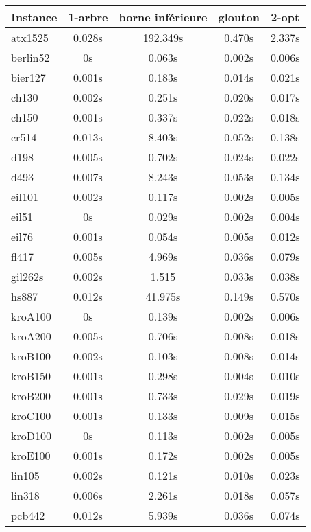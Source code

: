 \begin{longtable}{|l||c|c|c|c|}
  \hline
  Instance & 1-arbre & borne inférieure & glouton & 2-opt\\
  \hline
  \hline
  atx1525 & 0.028s & 192.349s & 0.470s & 2.337s \\
  \hline
  berlin52 & 0s & 0.063s & 0.002s & 0.006s \\
  \hline
  bier127 & 0.001s & 0.183s & 0.014s & 0.021s \\
  \hline
  ch130 & 0.002s & 0.251s & 0.020s & 0.017s \\
  \hline
  ch150 & 0.001s & 0.337s & 0.022s & 0.018s \\
  \hline
  cr514 & 0.013s & 8.403s & 0.052s & 0.138s \\
  \hline
  d198 & 0.005s & 0.702s & 0.024s & 0.022s \\
  \hline
  d493 & 0.007s & 8.243s & 0.053s & 0.134s \\
  \hline
  eil101 & 0.002s & 0.117s & 0.002s & 0.005s \\
  \hline
  eil51 & 0s & 0.029s & 0.002s & 0.004s \\
  \hline
  eil76 & 0.001s & 0.054s & 0.005s & 0.012s \\
  \hline
  fl417 & 0.005s & 4.969s & 0.036s & 0.079s \\
  \hline
  gil262s & 0.002s & 1.515 & 0.033s & 0.038s \\
  \hline
  hs887 & 0.012s & 41.975s & 0.149s & 0.570s \\
  \hline
  kroA100 & 0s & 0.139s & 0.002s & 0.006s \\
  \hline
  kroA200 & 0.005s & 0.706s & 0.008s & 0.018s \\
  \hline
  kroB100 & 0.002s & 0.103s & 0.008s & 0.014s \\
  \hline
  kroB150 & 0.001s & 0.298s & 0.004s & 0.010s \\
  \hline
  kroB200 & 0.001s & 0.733s & 0.029s & 0.019s \\
  \hline
  kroC100 & 0.001s & 0.133s & 0.009s & 0.015s \\
  \hline
  kroD100 & 0s & 0.113s & 0.002s & 0.005s \\
  \hline
  kroE100 & 0.001s & 0.172s & 0.002s & 0.005s \\
  \hline
  lin105 & 0.002s & 0.121s & 0.010s & 0.023s \\
  \hline
  lin318 & 0.006s & 2.261s & 0.018s & 0.057s \\
  \hline
  pcb442 & 0.012s & 5.939s & 0.036s & 0.074s \\

\end{longtable}
